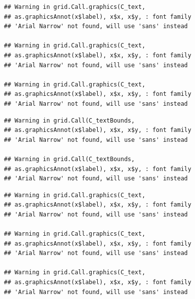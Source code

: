 \documentclass[]{krantz}
\begin{document}
\begin{verbatim}
## Warning in grid.Call.graphics(C_text,
## as.graphicsAnnot(x$label), x$x, x$y, : font family
## 'Arial Narrow' not found, will use 'sans' instead

## Warning in grid.Call.graphics(C_text,
## as.graphicsAnnot(x$label), x$x, x$y, : font family
## 'Arial Narrow' not found, will use 'sans' instead

## Warning in grid.Call.graphics(C_text,
## as.graphicsAnnot(x$label), x$x, x$y, : font family
## 'Arial Narrow' not found, will use 'sans' instead
\end{verbatim}

\begin{verbatim}
## Warning in grid.Call(C_textBounds,
## as.graphicsAnnot(x$label), x$x, x$y, : font family
## 'Arial Narrow' not found, will use 'sans' instead

## Warning in grid.Call(C_textBounds,
## as.graphicsAnnot(x$label), x$x, x$y, : font family
## 'Arial Narrow' not found, will use 'sans' instead
\end{verbatim}

\begin{verbatim}
## Warning in grid.Call.graphics(C_text,
## as.graphicsAnnot(x$label), x$x, x$y, : font family
## 'Arial Narrow' not found, will use 'sans' instead

## Warning in grid.Call.graphics(C_text,
## as.graphicsAnnot(x$label), x$x, x$y, : font family
## 'Arial Narrow' not found, will use 'sans' instead

## Warning in grid.Call.graphics(C_text,
## as.graphicsAnnot(x$label), x$x, x$y, : font family
## 'Arial Narrow' not found, will use 'sans' instead
\end{verbatim}
\end{document}
